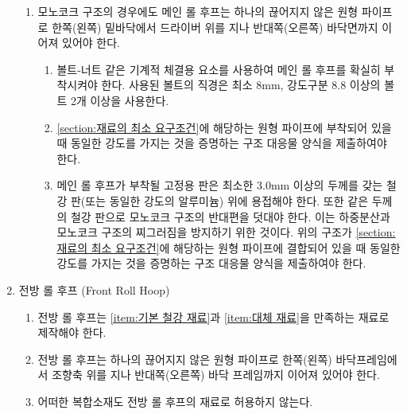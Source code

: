 \documentclass[final,a4paper,10pt]{report}
\begin{document}
\begin{enumerate}
\begin{enumerate}
      \item 모노코크 구조의 경우에도 메인 롤 후프는 하나의 끊어지지 않은 원형 파이프로 한쪽(왼쪽) 밑바닥에서 드라이버 위를 지나 반대쪽(오른쪽) 바닥면까지 이어져 있어야 한다. \label{item:모노코크 메인 롤 후프}
        \begin{enumerate}
          \item 볼트-너트 같은 기계적 체결용 요소를 사용하여 메인 롤 후프를 확실히 부착시켜야 한다. 사용된 볼트의 직경은 최소 8mm, 강도구분 8.8 이상의 볼트 2개 이상을 사용한다.
          \item \cref{section:재료의 최소 요구조건}에 해당하는 원형 파이프에 부착되어 있을 때 동일한 강도를 가지는 것을 증명하는 구조 대응물 양식을 제출하여야 한다.
          \item 메인 롤 후프가 부착될 고정용 판은 최소한 3.0mm 이상의 두께를 갖는 철강 판(또는 동일한 강도의 알루미늄) 위에 용접해야 한다. 또한 같은 두께의 철강 판으로 모노코크 구조의 반대편을 덧대야 한다. 이는 하중분산과 모노코크 구조의 찌그러짐을 방지하기 위한 것이다. 위의 구조가 \cref{section:재료의 최소 요구조건}에 해당하는 원형 파이프에 결합되어 있을 때 동일한 강도를 가지는 것을 증명하는 구조 대응물 양식을 제출하여야 한다.
        \end{enumerate}
    \end{enumerate}
    
  \item 전방 롤 후프 (Front Roll Hoop) \label{item:전방 롤 후프}
    \begin{enumerate}
      \item 전방 롤 후프는 \cref{item:기본 철강 재료}과 \cref{item:대체 재료}을 만족하는 재료로 제작해야 한다.
      \item 전방 롤 후프는 하나의 끊어지지 않은 원형 파이프로 한쪽(왼쪽) 바닥프레임에서 조향축 위를 지나 반대쪽(오른쪽) 바닥 프레임까지 이어져 있어야 한다.
      \item 어떠한 복합소재도 전방 롤 후프의 재료로 허용하지 않는다.
    \end{enumerate}
\end{enumerate}
\end{document}
